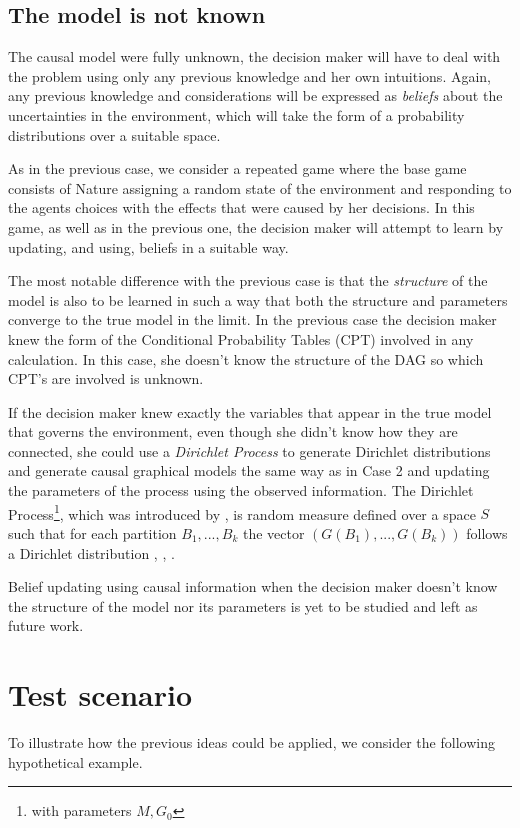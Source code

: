 \documentclass{article}
\begin{document}
\subsection{The model is not known}
The causal model were fully unknown, the decision maker will have to deal with the problem using only any previous knowledge and her own intuitions. Again, any previous knowledge and considerations will be expressed as \textit{beliefs} about the uncertainties in the environment, which will take the form of a probability distributions over a suitable space. 

As in the previous case, we consider a repeated game where the base game consists of Nature assigning a random state of the environment and responding to the agents choices with the effects that were caused by her decisions. In this game, as well as in the previous one, the decision maker will attempt to learn by updating, and using, beliefs in a suitable way. 

The most notable difference with the previous case is that the \textit{structure} of the model is also to be learned in such a way that both the structure and parameters converge to the true model in the limit. In the previous case the decision maker knew the form of the Conditional Probability Tables (CPT) involved in any calculation. In this case, she doesn't know the structure of the DAG so which CPT's are involved is unknown.

If the decision maker knew exactly the variables that appear in the true model that governs the environment, even though she didn't know how they are connected, she could use a \textit{Dirichlet Process} to generate Dirichlet distributions and generate causal graphical models the same way as in Case 2 and updating the parameters of the process using the observed information. The Dirichlet Process\footnote{with parameters $M,G_0$}, which was introduced by \cite{ferguson1973bayesian}, is random measure defined over a space $S$ such that for each partition $B_1,...,B_k$ the vector $(G(B_1),...,G(B_k))$ follows a Dirichlet distribution \cite{hjort2010bayesian}, \cite{muller2016bayesian}, \cite{ghosal2017fundamentals}. 

Belief updating using causal information when the decision maker doesn't know the structure of the model nor its parameters is yet to be studied and left as future work. 

\section{Test scenario}
To illustrate how the previous ideas could be applied, we consider the following hypothetical example.
\end{document}
